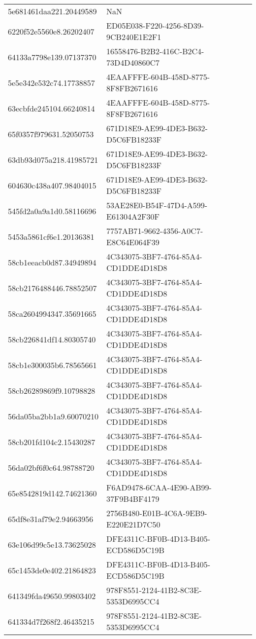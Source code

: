 \begin{tabular}{ll}
5e681461daa221.20449589 & NaN \\
6220f52e5560e8.26202407 & ED05E038-F220-4256-8D39-9CB240E1E2F1 \\
64133a7798e139.07137370 & 16558476-B2B2-416C-B2C4-73D4D40860C7 \\
5e5e342e532c74.17738857 & 4EAAFFFE-604B-458D-8775-8F8FB2671616 \\
63ecbfde245104.66240814 & 4EAAFFFE-604B-458D-8775-8F8FB2671616 \\
65f0357f979631.52050753 & 671D18E9-AE99-4DE3-B632-D5C6FB18233F \\
63db93d075a218.41985721 & 671D18E9-AE99-4DE3-B632-D5C6FB18233F \\
604630c438a407.98404015 & 671D18E9-AE99-4DE3-B632-D5C6FB18233F \\
545fd2a0a9a1d0.58116696 & 53AE28E0-B54F-47D4-A599-E61304A2F30F \\
5453a5861cf6e1.20136381 & 7757AB71-9662-4356-A0C7-E8C64E064F39 \\
58cb1eeacb0d87.34949894 & 4C343075-3BF7-4764-85A4-CD1DDE4D18D8 \\
58cb2176488446.78852507 & 4C343075-3BF7-4764-85A4-CD1DDE4D18D8 \\
58ca2604994347.35691665 & 4C343075-3BF7-4764-85A4-CD1DDE4D18D8 \\
58cb226841df14.80305740 & 4C343075-3BF7-4764-85A4-CD1DDE4D18D8 \\
58cb1e300035b6.78565661 & 4C343075-3BF7-4764-85A4-CD1DDE4D18D8 \\
58cb26289869f9.10798828 & 4C343075-3BF7-4764-85A4-CD1DDE4D18D8 \\
56da05ba2bb1a9.60070210 & 4C343075-3BF7-4764-85A4-CD1DDE4D18D8 \\
58cb201fd104c2.15430287 & 4C343075-3BF7-4764-85A4-CD1DDE4D18D8 \\
56da02bf6f0c64.98788720 & 4C343075-3BF7-4764-85A4-CD1DDE4D18D8 \\
65e8542819d142.74621360 & F6AD9478-6CAA-4E90-AB99-37F9B4BF4179 \\
65df8e31af79e2.94663956 & 2756B480-E01B-4C6A-9EB9-E220E21D7C50 \\
63e106d99c5e13.73625028 & DFE4311C-BF0B-4D13-B405-ECD586D5C19B \\
65c1453de0e402.21864823 & DFE4311C-BF0B-4D13-B405-ECD586D5C19B \\
641349fda49650.99803402 & 978F8551-2124-41B2-8C3E-5353D6995CC4 \\
641334d7f268f2.46435215 & 978F8551-2124-41B2-8C3E-5353D6995CC4 \\

\end{tabular}
